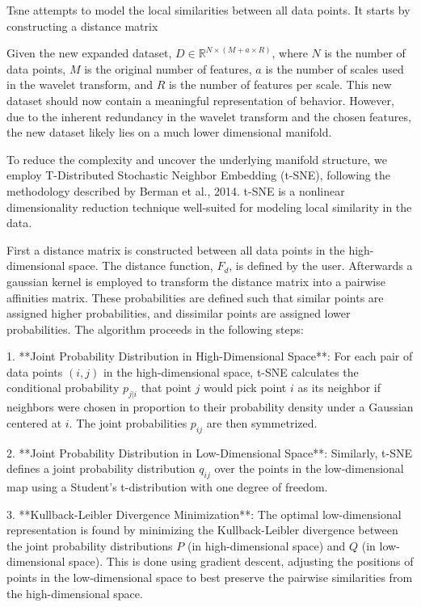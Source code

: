 \documentclass[12pt,english]{article}
\begin{document}
Tsne attempts to model the local similarities between all data points. It starts by constructing a distance matrix 

Given the new expanded dataset, \( D \in \mathbb{R}^{N \times (M + a \times R)} \), where \( N \) is the number of data points, \( M \) is the original number of features, \( a \) is the number of scales used in the wavelet transform, and \( R \) is the number of features per scale. This new dataset should now contain a meaningful representation of behavior. However, due to the inherent redundancy in the wavelet transform and the chosen features, the new dataset likely lies on a much lower dimensional manifold.

To reduce the complexity and uncover the underlying manifold structure, we employ T-Distributed Stochastic Neighbor Embedding (t-SNE), following the methodology described by Berman et al., 2014. t-SNE is a nonlinear dimensionality reduction technique well-suited for modeling local similarity in the data.

First a distance matrix is constructed between all data points in the high-dimensional space. The distance function, \(F_{d}\), is defined by the user. Afterwards a gaussian kernel is employed to transform the distance matrix into a pairwise affinities matrix. These probabilities are defined such that similar points are assigned higher probabilities, and dissimilar points are assigned lower probabilities. The algorithm proceeds in the following steps:

1. **Joint Probability Distribution in High-Dimensional Space**: For each pair of data points \( (i, j) \) in the high-dimensional space, t-SNE calculates the conditional probability \( p_{j|i} \) that point \( j \) would pick point \( i \) as its neighbor if neighbors were chosen in proportion to their probability density under a Gaussian centered at \( i \). The joint probabilities \( p_{ij} \) are then symmetrized.

2. **Joint Probability Distribution in Low-Dimensional Space**: Similarly, t-SNE defines a joint probability distribution \( q_{ij} \) over the points in the low-dimensional map using a Student's t-distribution with one degree of freedom. 

3. **Kullback-Leibler Divergence Minimization**: The optimal low-dimensional representation is found by minimizing the Kullback-Leibler divergence between the joint probability distributions \( P \) (in high-dimensional space) and \( Q \) (in low-dimensional space). This is done using gradient descent, adjusting the positions of points in the low-dimensional space to best preserve the pairwise similarities from the high-dimensional space.
\end{document}
